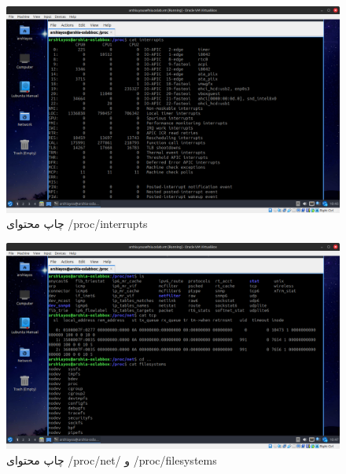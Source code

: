 \documentclass[12pt]{article}
\begin{document}
	\begin{figure}[H]
		\centering
		\includegraphics[width=\textwidth]{report3-resources/212.png}
		\caption{چاپ محتوای /proc/interrupts}
		\label{fig:22}
	\end{figure}
	\begin{figure}[H]
		\centering
		\includegraphics[width=\textwidth]{report3-resources/213.png}
		\caption{چاپ محتوای /proc/net/ و /proc/filesystems}
		\label{fig:23}
	\end{figure}
	
\end{document}
